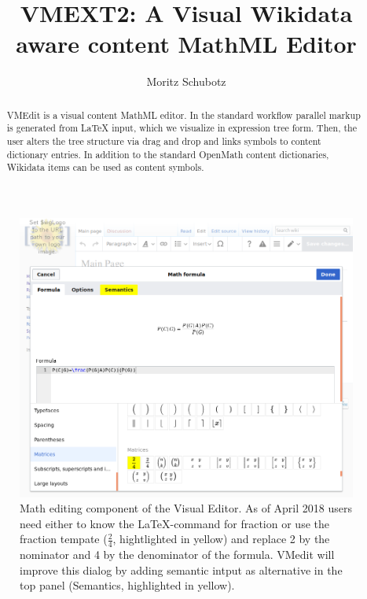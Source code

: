 \documentclass{llncs}
\begin{document}
\title{VMEXT2: A Visual Wikidata aware content MathML Editor}

\author{
   Moritz Schubotz
}


\maketitle

\begin{abstract}
VMEdit is a visual content MathML editor.
In the standard workflow parallel markup is generated from LaTeX input, which we visualize in expression tree form.
Then, the user alters the tree structure via drag and drop and links symbols to content dictionary entries.
In addition to the standard OpenMath content dictionaries, Wikidata items can be used as content symbols.
\end{abstract}

\begin{figure}[t]
\includegraphics[width=\textwidth]{images/overview.png}
\caption{Math editing component of the Visual Editor.
 As of April 2018 users need either to know the {\LaTeX}-command for fraction or use the fraction tempate ($\frac{2}{4}$, hightlighted in yellow) and replace 2 by the nominator and 4 by the denominator of the formula.
 VMedit will improve this dialog by adding semantic intput as alternative in the top panel (Semantics, highlighted in yellow).}\label{fig.overview}
\end{figure}
\end{document}
